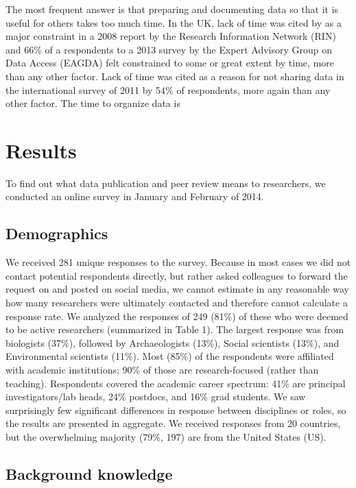 \documentclass[10pt]{article}
\begin{document}
The most frequent answer is that preparing and documenting data so that it is useful for others takes too much time.
In the UK, lack of time was cited by as a major constraint in a 2008 report by the Research Information Network (RIN)\cite{swan_share_2008} and 66\% of a respondents to a 2013 survey by the Expert Advisory Group on Data Access (EAGDA) felt constrained to some or great extent by time, more than any other factor\cite{bobrow_establishing_2014}.
Lack of time was cited as a reason for not sharing data in the international survey of 2011 by 54\% of respondents, more again than any other factor\cite{tenopi_data_2011}.
The time to organize data is



\section*{Results}
To find out what data publication and peer review means to researchers, we conducted an online survey in January and February of 2014.

\subsection*{Demographics}

We received 281 unique responses to the survey.
Because in most cases we did not contact potential respondents directly, but rather asked colleagues to forward the request on and posted on social media, we cannot estimate in any reasonable way how many researchers were ultimately contacted and therefore cannot calculate a response rate.
We analyzed the responses of 249 (81\%) of these who were deemed to be active researchers (summarized in Table 1).
The largest response was from biologists (37\%), followed by Archaeologists (13\%), Social scientists (13\%), and Environmental scientists (11\%).
Most (85\%) of the respondents were affiliated with academic institutions; 90\% of those are research-focused (rather than teaching).
Respondents covered the academic career spectrum: 41\% are principal investigators/lab heads, 24\% postdocs, and 16\% grad students.
We saw surprisingly few significant differences in response between disciplines or roles, so the results are presented in aggregate.
We received responses from 20 countries, but the overwhelming majority (79\%, 197) are from the United States (US).

\subsection*{Background knowledge}
\end{document}
